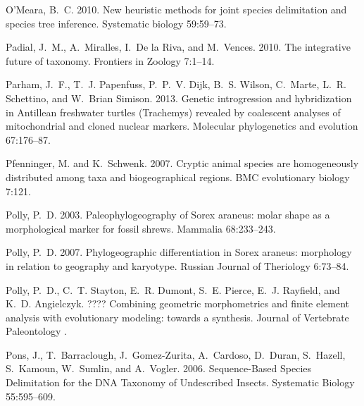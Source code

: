 \documentclass[12pt,letterpaper]{article}
\begin{document}
\begin{thebibliography}{77}
        O'Meara, B.~C. 2010. {New heuristic methods for joint species delimitation and
        species tree inference.} Systematic biology 59:59--73.

        Padial, J.~M., A.~Miralles, I.~{De la Riva}, and M.~Vences. 2010. {The
        integrative future of taxonomy}. Frontiers in Zoology 7:1--14.

        Parham, J.~F., T.~J. Papenfuss, P.~P.~V. Dijk, B.~S. Wilson, C.~Marte, L.~R.
        Schettino, and W.~{Brian Simison}. 2013. {Genetic introgression and
          hybridization in Antillean freshwater turtles (Trachemys) revealed by
        coalescent analyses of mitochondrial and cloned nuclear markers.} Molecular
        phylogenetics and evolution 67:176--87.

        Pfenninger, M. and K.~Schwenk. 2007. {Cryptic animal species are homogeneously
        distributed among taxa and biogeographical regions.} BMC evolutionary biology
        7:121.

        Polly, P.~D. 2003. {Paleophylogeography of Sorex araneus: molar shape as a
        morphological marker for fossil shrews}. Mammalia 68:233--243.

        Polly, P.~D. 2007. {Phylogeographic differentiation in Sorex araneus:
        morphology in relation to geography and karyotype}. Russian Journal of
        Theriology 6:73--84.

        Polly, P.~D., C.~T. Stayton, E.~R. Dumont, S.~E. Pierce, E.~J. Rayfield, and
        K.~D. Angielczyk. ???? {Combining geometric morphometrics and finite element
        analysis with evolutionary modeling: towards a synthesis}. Journal of
        Vertebrate Paleontology .

        Pons, J., T.~Barraclough, J.~Gomez-Zurita, A.~Cardoso, D.~Duran, S.~Hazell,
        S.~Kamoun, W.~Sumlin, and A.~Vogler. 2006. {Sequence-Based Species
        Delimitation for the DNA Taxonomy of Undescribed Insects}. Systematic Biology
        55:595--609.


\end{thebibliography}
\end{document}
